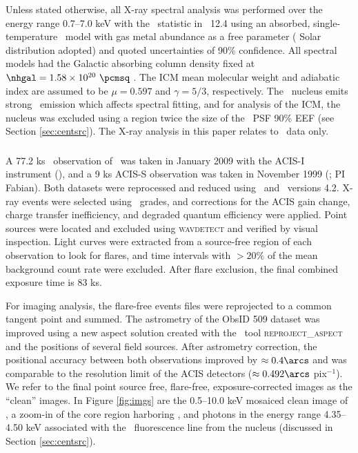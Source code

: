 \documentclass[useAMS,usenatbib]{mn2e}
\begin{document}
Unless stated otherwise, all X-ray spectral analysis was performed
over the energy range 0.7--7.0 keV with the \chisq\ statistic in
\xspec\ 12.4 \citep{xspec} using an absorbed, single-temperature
\mekal\ model \citep{mekal1} with gas metal abundance as a free
parameter (\citealt{ag89} Solar distribution adopted) and quoted
uncertainties of 90\% confidence. All spectral models had the Galactic
absorbing column density fixed at $\nhgal = 1.58 \times 10^{20}
~\pcmsq$ \citep{lab}. The ICM mean molecular weight and adiabatic
index are assumed to be $\mu = 0.597$ and $\gamma = 5/3$,
respectively. The \irs\ nucleus emits strong \feka\ emission which
affects spectral fitting, and for analysis of the ICM, the nucleus was
excluded using a region twice the size of the \cxo\ PSF 90\% EEF (see
Section \ref{sec:centsrc}). The X-ray analysis in this paper relates
to \cxo\ data only.

\subsubsection{\cxo}

A 77.2 ks \cxo\ observation of \irs\ was taken in January 2009 with
the ACIS-I instrument (),
and a 9 ks ACIS-S observation was taken in November 1999 (; PI Fabian). Both datasets were
reprocessed and reduced using \ciao\ and \caldb\ versions 4.2. X-ray
events were selected using \asca\ grades, and corrections for the ACIS
gain change, charge transfer inefficiency, and degraded quantum
efficiency were applied. Point sources were located and excluded using
{\textsc{wavdetect}} and verified by visual inspection. Light curves
were extracted from a source-free region of each observation to look
for flares, and time intervals with $> 20\%$ of the mean background
count rate were excluded. After flare exclusion, the final combined
exposure time is 83 ks.

For imaging analysis, the flare-free events files were reprojected to
a common tangent point and summed. The astrometry of the ObsID 509
dataset was improved using a new aspect solution created with the
\ciao\ tool {\textsc{reproject\_aspect}} and the positions of several
field sources. After astrometry correction, the positional accuracy
between both observations improved by $\approx 0.4\arcs$ and was
comparable to the resolution limit of the ACIS detectors ($\approx
0.492\arcs$ pix$^{-1}$). We refer to the final point source free,
flare-free, exposure-corrected images as the ``clean'' images. In
Figure \ref{fig:imgs} are the 0.5--10.0 keV mosaiced clean image of
\rxj, a zoom-in of the core region harboring \irs, and photons in the
energy range 4.35--4.50 keV associated with the \feka\ fluorescence
line from the nucleus (discussed in Section \ref{sec:centsrc}).
\end{document}
